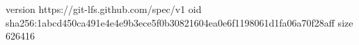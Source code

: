version https://git-lfs.github.com/spec/v1
oid sha256:1abcd450ca491e4e4e9b3ece5f0b30821604ea0e6f1198061d1fa06a70f28aff
size 626416
